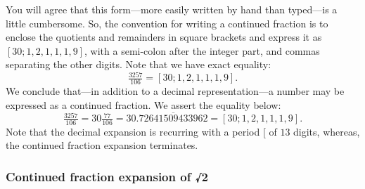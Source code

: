 \documentclass[
  a4paper,
]{article}
\begin{document}
You will agree that this form---more easily written by hand than
typed---is a little cumbersome. So, the convention for writing a
continued fraction is to enclose the quotients and remainders in square
brackets and express it as \([30; 1, 2, 1, 1, 1, 9]\), with a semi-colon
after the integer part, and commas separating the other digits. Note
that we have exact equality: \[
\tfrac{3257}{106} = [30; 1, 2, 1, 1, 1, 9].
\] We conclude that---in addition to a decimal representation---a number
may be expressed as a continued fraction. We assert the equality below:
\[
\tfrac{3257}{106} = 30 \tfrac{77}{106} = 30.\overline{72641509433962} = [30; 1, 2, 1, 1, 1, 9].
\] Note that the decimal expansion is recurring with a period
{[}\citeproc{ref-period}{12}{]} of \(13\) digits, whereas, the continued
fraction expansion terminates.

\subsubsection{Continued fraction expansion of
√2}\label{continued-fraction-expansion-of-2}
\end{document}
